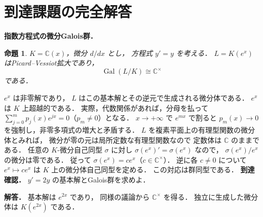 \documentclass[a5paper,10pt,onecolumn]{jsarticle}
\makeatletter
\theoremstyle{mathnotetheorem}
\newtheorem{proposition}[theorem]{命題}
\renewcommand{\proofname}{証明}
\renewenvironment{proof}[1][\proofname]{%
  \par\pushQED{\qed}\normalfont\topsep4\p@\@plus2\p@\relax
  \trivlist\item[\hskip\labelsep\bfseries #1]\ignorespaces
}{\popQED\endtrivlist\@endpefalse}
\makeatother
\begin{document}
\section{到達課題の完全解答}
\noindent\textbf{指数方程式の微分Galois群．}
\begin{proposition}
$K=\mathbb C(x)$，微分 $d/dx$ とし，
方程式 $y'=y$ を考える．
$L=K(e^x)$ はPicard--Vessiot拡大であり，
\[
\operatorname{Gal}(L/K)\cong\mathbb C^\times
\]
である．
\end{proposition}
\begin{proof}
$e^x$ は非零解であり，
$L$ はこの基本解とその逆元で生成される微分体である．
$e^x$ は $K$ 上超越的である．
実際，代数関係があれば，分母を払って
$\sum_{j=0}^mp_j(x)e^{jx}=0$（$p_m\ne0$）となる．
$x\to+\infty$ で $e^{mx}$ で割ると
$p_m(x)\to0$ を強制し，非零多項式の増大と矛盾する．
$L$ を複素平面上の有理型関数の微分体とみれば，
微分が零の元は局所定数な有理型関数なので
定数体は $\mathbb C$ のままである．
任意の $K$-微分自己同型 $\sigma$ に対し
$\sigma(e^x)'=\sigma(e^x)$ なので，
$\sigma(e^x)/e^x$ の微分は零である．
従って $\sigma(e^x)=ce^x$（$c\in\mathbb C^\times$）．
逆に各 $c\ne0$ について $e^x\mapsto ce^x$ は
$K$ 上の微分体自己同型を定める．
この対応は群同型である．
\end{proof}
\noindent\textbf{到達確認．}
$y'=2y$ の基本解とGalois群を求めよ．
\par\noindent\textbf{解答．}
基本解は $e^{2x}$ であり，
同様の議論から $\mathbb C^\times$ を得る．
独立に生成した微分体は $K(e^{2x})$ である．
\end{document}
